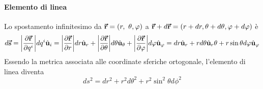\paragraph{Elemento di linea}
Lo spostamento infinitesimo da $\vb*{\va{r}}=(r,\ \theta, \varphi)$ a $\vb*{\va{r}}+d\vb*{\va{r}}=(r + dr, \theta + d\theta, \varphi + d\varphi)$ è
\begin{equation}
	d\vb*{\va{s}}=\abs{\pdv{\vb*{\va{r}}}{q^i}}dq^i\hat{\mathbf{u}}_i=\abs{\pdv{\vb*{\va{r}}}{r}}dr\hat{\mathbf{u}}_r+\abs{\pdv{\vb*{\va{r}}}{\theta}}d\theta\hat{\mathbf{u}}_\theta+\abs{\pdv{\vb*{\va{r}}}{\varphi}}d\varphi\hat{\mathbf{u}}_\varphi=dr\hat{\mathbf{u}}_r+rd\theta\hat{\mathbf{u}}_r\theta+r\sin\theta d\varphi\hat{\mathbf{u}}_\varphi\label{spinfinitesimosferiche}
\end{equation}
Essendo la metrica associata alle coordinate sferiche ortogonale, l'elemento di linea diventa
\begin{equation}
	ds^2=dr^2+r^2d\theta^2+r^2\sin^2\theta d\phi^2
\end{equation}
